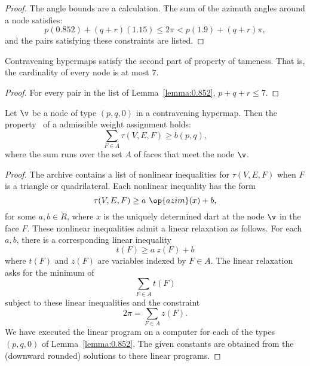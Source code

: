 \begin{proof}
The angle bounds are a calculation.  The sum of the azimuth angles
around a node satisfies:
\[ 
p (0.852) + (q+r) (1.15) \le 2\pi < p (1.9) + (q+r) \pi,
\] 
and the pairs satisfying these constraints are listed.
\end{proof}

\begin{lemma}[]\label{lemma:node-upper}
Contravening hypermaps satisfy the second part of property 
of tameness.  That is, the cardinality of every
node is at most $7$.
\end{lemma}

\begin{proof}  For every pair in the list of Lemma~\ref{lemma:0.852},  $p+q+r\le 7$.
\end{proof}




\begin{lemma}[] \label{lemma:weightB}
  Let $\v$ be a node of type $(p,q,0)$ in a contravening hypermap.
  Then the property~ of a admissible weight assignment
  holds:
\[ 
\sum_{ F\in A} \tau(V,E,F) \ge  b(p,q),
\] 
where the sum runs over the set $A$ of faces that meet the node $\v$.
\end{lemma}
%
%

\begin{proof}   The archive
  \cite[FUSDSPJ]{hales:2009:nonlinear} contains a list of nonlinear
  inequalities for $\tau(V,E,F)$ when $F$ is a triangle or
  quadrilateral. Each nonlinear inequality has the form
\[ \tau(V,E,F) \ge a~\op{azim}(x) + b,\] 
for some $a,b\in\ring{R}$, where $x$ is the uniquely determined dart
at the node $\v$ in the face $F$.  These nonlinear inequalities admit
a linear relaxation as follows.  For each $a,b$, there is a corresponding
linear inequality %
%
\[ 
t(F) \ge a~z(F) + b
\] 
where $t(F)$ and $z(F)$ are variables indexed by $F\in A$.
%
%
%
The linear relaxation asks for the minimum of 
\[ \sum_{F\in A} t(F)\] 
subject to these linear inequalities and the constraint
\[ 
2\pi = \sum_{F\in A} z(F).
\] 
We have executed the linear program on a computer for each of the
types $(p,q,0)$ of Lemma~\ref{lemma:0.852}. The given constants are
obtained from the (downward rounded) solutions to these linear
programs.
\end{proof}

